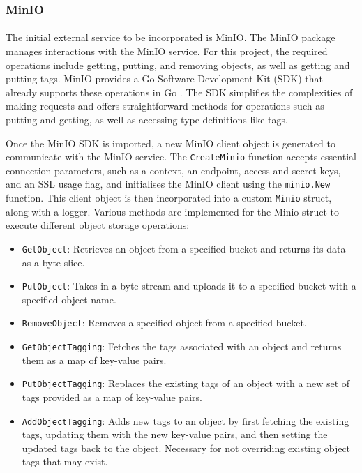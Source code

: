 \documentclass[12pt, conference, final, a4paper, onecolumn, compsoc]{IEEEtran}
\begin{document}
\subsubsection*{MinIO}
\paragraph{}

The initial external service to be incorporated is MinIO. The MinIO package
manages interactions with the MinIO service. For this project, the required
operations include getting, putting, and removing objects, as well as getting
and putting tags. MinIO provides a Go Software Development Kit (SDK) that
already supports these operations in Go \citep{minio-go-repo}. The SDK
simplifies the complexities of making requests and offers straightforward
methods for operations such as putting and getting, as well as accessing type
definitions like tags.

Once the MinIO SDK is imported, a new MinIO client object is generated to
communicate with the MinIO service. The \texttt{CreateMinio} function accepts
essential connection parameters, such as a context, an endpoint, access and
secret keys, and an SSL usage flag, and initialises the MinIO client using the
\texttt{minio.New} function. This client object is then incorporated into a
custom \texttt{Minio} struct, along with a logger. Various methods are
implemented for the Minio struct to execute different object storage operations:

\begin{itemize}
  \item \texttt{GetObject}: Retrieves an object from a specified bucket and
        returns its data as a byte slice.
  \item \texttt{PutObject}: Takes in a byte stream and uploads it to a specified
        bucket with a specified object name.
  \item \texttt{RemoveObject}: Removes a specified object from a specified
        bucket.
  \item \texttt{GetObjectTagging}: Fetches the tags associated with an object
        and returns them as a map of key-value pairs.
  \item \texttt{PutObjectTagging}: Replaces the existing tags of an object with
        a new set of tags provided as a map of key-value pairs.
  \item \texttt{AddObjectTagging}: Adds new tags to an object by first fetching
        the existing tags, updating them with the new key-value pairs, and then
        setting the updated tags back to the object. Necessary for not
        overriding existing object tags that may exist.
\end{itemize}
\end{document}
